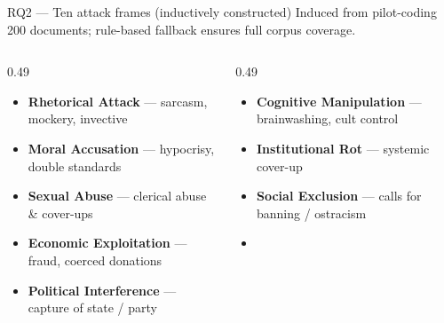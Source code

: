 \documentclass[aspectratio=169,10pt]{beamer}
\begin{document}
\begin{frame}{RQ2 — Ten attack frames (inductively constructed)}
  \vspace{0.15em}
  \textcolor{mutedgray}{\footnotesize
    Induced from pilot-coding 200 documents;
    rule-based fallback ensures full corpus coverage.}
  \vspace{0.5em}

  \begin{columns}[T,onlytextwidth]
    \begin{column}{0.49\textwidth}
      \setlength{\leftmargini}{0.9em}
      \begin{itemize}\footnotesize\itemsep5pt
        \item[\textcolor{uzhblue}{$\blacksquare$}]
          \textbf{Rhetorical Attack} {\color{mutedgray}— sarcasm, mockery, invective}
        \item[\textcolor{uzhblue}{$\blacksquare$}]
          \textbf{Moral Accusation} {\color{mutedgray}— hypocrisy, double standards}
        \item[\textcolor{uzhaccent}{$\blacksquare$}]
          \textbf{Sexual Abuse} {\color{mutedgray}— clerical abuse \& cover-ups}
        \item[\textcolor{uzhaccent}{$\blacksquare$}]
          \textbf{Economic Exploitation} {\color{mutedgray}— fraud, coerced donations}
        \item[\textcolor{uzhaccent}{$\blacksquare$}]
          \textbf{Political Interference} {\color{mutedgray}— capture of state / party}
      \end{itemize}
    \end{column}
    \begin{column}{0.49\textwidth}
      \setlength{\leftmargini}{0.9em}
      \begin{itemize}\footnotesize\itemsep5pt
        \item[\textcolor{uzhaccent}{$\blacksquare$}]
          \textbf{Cognitive Manipulation} {\color{mutedgray}— brainwashing, cult control}
        \item[\textcolor{uzhaccent}{$\blacksquare$}]
          \textbf{Institutional Rot} {\color{mutedgray}— systemic cover-up}
        \item[\textcolor{uzhblue}{$\blacksquare$}]
          \textbf{Social Exclusion} {\color{mutedgray}— calls for banning / ostracism}
        \item[\textcolor{uzhaccent}{$\blacksquare$}]

\end{itemize}
\end{column}
\end{columns}
\end{frame}
\end{document}
